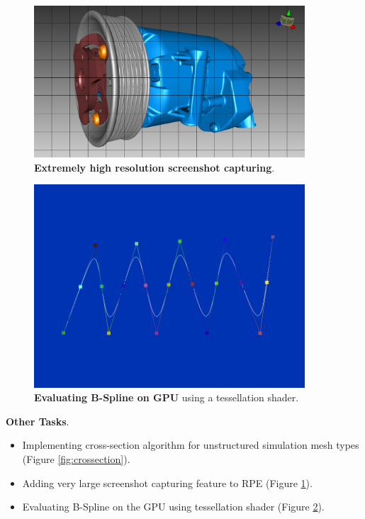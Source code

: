 \documentclass[]{report}
\begin{document}
\begin{figure}[!ht]
	\centering
	\includegraphics[width=0.90\textwidth]{./figs/highresscreenshot.png}
	\caption[Extremely high resolution screenshot capturing]{\textbf{Extremely high resolution screenshot capturing}.}
	\label{fig:highres}
\end{figure}

\begin{figure}[!ht]
	\centering
	\includegraphics[width=0.90\textwidth]{./figs/bspline.png}
	\caption[B-Spline GPU Tessellation]{\textbf{Evaluating B-Spline on GPU} using a tessellation shader.}
	\label{fig:bspline}
\end{figure}

\textbf{Other Tasks}.
\begin{itemize}
	\item Implementing cross-section algorithm for unstructured simulation mesh types (Figure \ref{fig:crossection}).
	\item Adding very large screenshot capturing feature to RPE (Figure \ref{fig:highres}).
	\item Evaluating B-Spline on the GPU using tessellation shader (Figure \ref{fig:bspline}).
\end{itemize}
 
\end{document}
